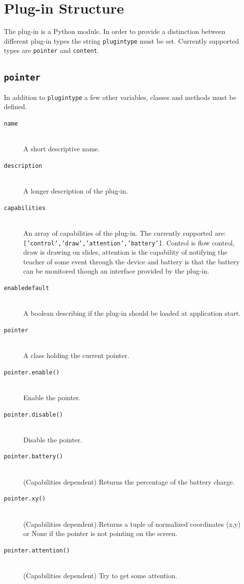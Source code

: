 \documentclass[a4paper,12pt]{article}
\newcommand{\ditem}[1]{\item[\texttt{{#1}}] \hfill \\}
\begin{document}
\section{Plug-in Structure}
\label{pluginstruct}
The plug-in is a Python module. In order to provide a distinction between different plug-in types the string \texttt{plugintype} must be set. Currently supported types are \texttt{pointer} and \texttt{content}.

\subsection{\texttt{pointer}}
In addition to \texttt{plugintype} a few other variables, classes and methods must be defined.

\begin{description}
\ditem{name}
A short descriptive name.

\ditem{description}
A longer description of the plug-in.

\ditem{capabilities}
An array of capabilities of the plug-in. The currently supported are: \texttt{['control','draw','attention','battery']}. Control is flow control, draw is drawing on slides, attention is the capability of notifying the teacher of some event through the device and battery is that the battery can be monitored though an interface provided by the plug-in.

\ditem{enabledefault}
A boolean describing if the plug-in should be loaded at application start.

\ditem{pointer}
A class holding the current pointer.

\ditem{pointer.enable()}
Enable the pointer.

\ditem{pointer.disable()}
Disable the pointer.

\ditem{pointer.battery()}
(Capabilities dependent) Returns the percentage of the battery charge.

\ditem{pointer.xy()}
(Capabilities dependent) Returns a tuple of normalized coordinates (x,y) or None if the pointer is not pointing on the screen.

\ditem{pointer.attention()}
(Capabilities dependent) Try to get some attention.

\end{description}
\end{document}
